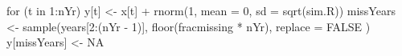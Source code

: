 \begin{Schunk}
\begin{Sinput}
 for (t in 1:nYr) {
   y[t] <- x[t] + rnorm(1, mean = 0, sd = sqrt(sim.R))
 }
 missYears <- sample(years[2:(nYr - 1)], floor(fracmissing * nYr),
   replace = FALSE
 )
 y[missYears] <- NA
\end{Sinput}
\end{Schunk}

